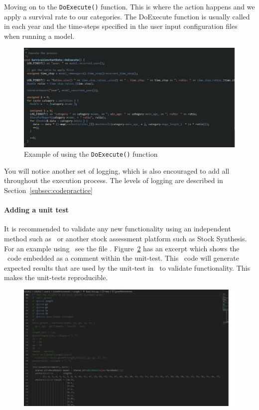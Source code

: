 Moving on to the \texttt{DoExecute()} function. This is where the action happens and we apply a survival rate to our categories. The DoExecute function is usually called in each year and the time-steps specified in the user input configuration files when running a model.

\begin{figure}[H]
	\centering
	\includegraphics[scale=0.5]{Figures/execute.png}
	\caption{Example of using the \texttt{DoExecute()} function}\label{fig:execute}
\end{figure}

You will notice another set of logging, which is also encouraged to add all throughout the execution process. The levels of logging are described in Section~\ref{subsec:codepractice}


\paragraph*{Adding a unit test}

It is recommended to validate any new functionality using an independent method such as \R\ or another stock assessment platform such as Stock Synthesis. For an example using \R\ see the file . Figure~\ref{fig:unittest1} has an excerpt which shows the \R\ code embedded as a comment within the unit-test. This \R\ code will generate expected results that are used by the unit-test in \CNAME\ to validate functionality. This makes the unit-tests reproducible.

\begin{figure}[!ht]
	\centering
	\includegraphics[scale=0.55]{Figures/unittestWithR.png}
	\caption{}\label{fig:unittest1}
\end{figure}


